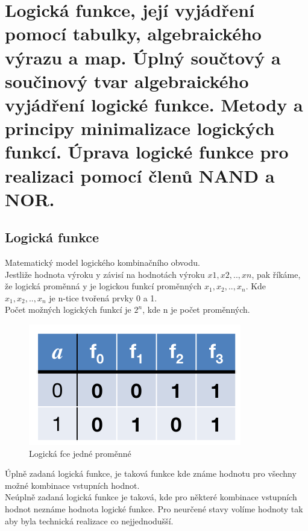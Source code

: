 \section{Logická funkce, její vyjádření pomocí tabulky, algebraického výrazu a map. Úplný součtový a součinový tvar algebraického vyjádření logické funkce. Metody a principy minimalizace logických funkcí. Úprava logické funkce pro realizaci pomocí členů NAND a NOR.}

\subsection{Logická funkce}
Matematický model logického kombinačního obvodu. \\
Jestliže hodnota výroku y závisí na hodnotách výroku \(x1, x2,..,xn\), pak říkáme, že logická proměnná y je logickou funkcí proměnných \(x_1,x_2,..,x_n\). Kde \(x_1,x_2,..,x_n\) je n-tice tvořená prvky 0 a 1.\\

Počet možných logických funkcí je \(2^n\), kde n je počet proměnných.

\begin{figure}[h!]
    \centering
    \includegraphics[scale = 0.5]{img/LogFce1.png}
    \caption*{Logická fce jedné proměnné}
\end{figure}

Úplně zadaná logická funkce, je taková funkce kde známe hodnotu pro všechny možné kombinace vstupních hodnot.\\
Neúplně zadaná logická funkce je taková, kde pro některé kombinace vstupních hodnot neznáme hodnota logické funkce. Pro neurčené stavy volíme hodnoty tak aby byla technická realizace co nejjednodušší.\\

